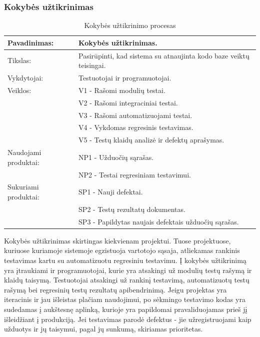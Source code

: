\documentclass{VUMIFPSkursinis}
\begin{document}
	\subsubsection{Kokybės užtikrinimas}
	\begin{center}
		\begin{table}[ht]
		\caption{Kokybės užtikrinimo procesas}
		\begin{tabular}{ | l | l | } 
		\hline
		Pavadinimas:         & Kokybės užtikrinimas.                                       \\ \hline
		Tikslas: 	           & Pasirūpinti, kad sistema su atnaujinta kodo baze veiktų teisingai. \\ \hline
		Vykdytojai:          & Testuotojai ir programuotojai.                                \\ \hline
		Veiklos:               & V1 - Rašomi modulių testai. \\
		  & V2 - Rašomi integraciniai testai. \\
		    & V3 - Rašomi automatizuojami testai.													\\	
			& V4 - Vykdomas regresinis testavimas.										\\
						             & V5 - Testų klaidų analizė ir defektų aprašymas.								 \\ \hline
		Naudojami produktai: & NP1 - Užduočių sąrašas. 																				\\
												 & NP2 - Testai regresiniam testavimui.																												 \\ \hline
		Sukuriami produktai: & SP1 - Nauji defektai.																							\\
												 & SP2 - Testų rezultatų dokumentas. 																	 \\
												 & SP3 - Papildytas naujais defektais užduočių sąrašas.															\\ \hline
		\end{tabular}
	\end{table}
		\end{center}
	Kokybės užtikrinimas skirtingas kiekvienam projektui. Tuose projektuose, kuriuose kuriamoje sistemoje egzistuoja vartotojo sąsaja, atliekamas rankinis testavimas kartu su automatizuotu regresiniu testavimu. Į kokybės užtikrinimą yra įtraukiami ir programuotojai, kurie yra atsakingi už modulių testų rašymą ir klaidų taisymą. Testuotojai atsakingi už rankinį testavimą, automatizuotų testų rašymą bei regresinių testų rezultatų apibendrinimą. Jeigu projektas yra iteracinis ir jau išleistas plačiam naudojimui, po sėkmingo testavimo kodas yra sudedamas į aukštesnę aplinką, kurioje yra papildomai pravaliduojamas prieš jį išleidžiant į produkciją. Jei testavimas parodė defektus - jie užregistruojami kaip užduotys ir jų taisymui, pagal jų sunkumą, skiriamas prioritetas. 
\end{document}
